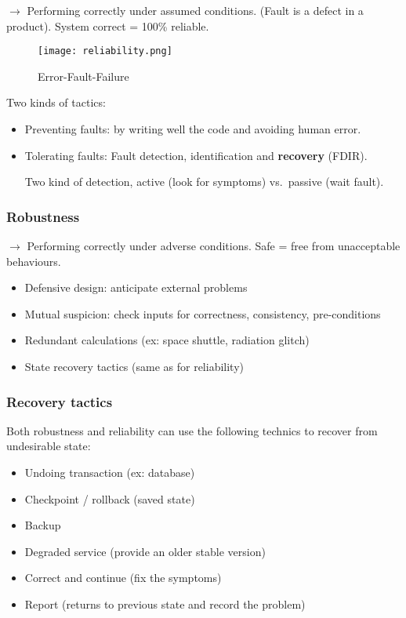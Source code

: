 $\rightarrow$ Performing correctly \textcolor{red!80!black}{under assumed conditions}. (Fault is a
defect in a product). System correct = 100\% reliable.

\begin{figure}[!ht]
    \centering
    \texttt{[image: reliability.png]}
    \caption{Error-Fault-Failure}
\end{figure}

Two kinds of tactics:

\begin{itemize}
    \item Preventing faults: by writing well the code and avoiding human error.
    \item Tolerating faults: Fault detection, identification and
        \textbf{recovery} (FDIR). 

        Two kind of detection, active (look for symptoms) vs.\ passive (wait fault).
\end{itemize}

\subsubsection{Robustness}

$\rightarrow$ Performing correctly \textcolor{red!80!black}{under adverse conditions}.
Safe = free from unacceptable behaviours.

\begin{itemize}
    \item Defensive design: anticipate external problems
    \item Mutual suspicion: check inputs for correctness, consistency, pre-conditions
    \item Redundant calculations (ex: space shuttle, radiation glitch)
    \item State recovery tactics (same as for reliability)
\end{itemize}

\subsubsection{Recovery tactics}

Both robustness and reliability can use the following technics to recover from undesirable
state:

\begin{itemize}
    \item Undoing transaction (ex: database)
    \item Checkpoint / rollback (saved state)
    \item Backup
    \item Degraded service (provide an older stable version)
    \item Correct and continue (fix the symptoms)
    \item Report (returns to previous state and record the problem)
\end{itemize}

